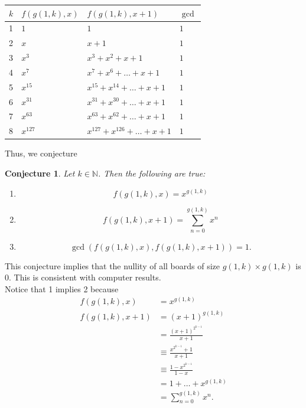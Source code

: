 \documentclass{article}
\newtheorem{conjecture}{Conjecture}
\newcommand{\N}{\mathbb{N}}
\begin{document}
	\begin{table}[H]
		\renewcommand{\arraystretch}{1.5}
		\centering
		\begin{tabular}{|l||l|l|l|}
			\hline
			$k$ & $f(g(1,k),x)$ & $f(g(1,k),x+1)$ & $\gcd$  \\
			\hline\hline
			1 & $1$ & $1$ & $1$ \\
			\hline
			2 & $x$ & $x+1$ & $1$ \\
			\hline
			3 & $x^3$ & $x^3+x^2+x+1$ & $1$ \\
			\hline
			4 & $x^7$ & $x^7 + x^6 + \dots + x + 1$ & $1$ \\
			\hline
			5 & $x^{15}$ & $x^{15} + x^{14} + \dots + x + 1$ & $1$ \\
			\hline
			6 & $x^{31}$ & $x^{31} + x^{30} + \dots + x + 1$ & $1$ \\
			\hline
			7 & $x^{63}$ & $x^{63} + x^{62} + \dots + x + 1$ & $1$ \\
			\hline
			8 & $x^{127}$ & $x^{127} + x^{126} + \dots + x + 1$ & $1$ \\
			\hline  
		\end{tabular}
	\end{table}
	Thus, we conjecture
	\begin{conjecture}
		Let $k \in \N$.
		Then the following are true:
		\begin{enumerate}
			\item
			\begin{equation*}
				f(g(1,k),x) = x^{g(1,k)}
			\end{equation*}
			\item
			\begin{equation*}
				f(g(1,k),x+1) = \sum_{n=0}^{g(1,k)}{x^n}
			\end{equation*}
			\item
			\begin{equation*}
				\gcd\left({f(g(1,k),x), f(g(1,k),x+1)}\right) = 1.
			\end{equation*}
		\end{enumerate}
	\end{conjecture}
	This conjecture implies that the nullity of all boards of size $g(1,k) \times g(1,k)$ is $0$.
	This is consistent with computer results. \\
	
	Notice that 1 implies 2 because
	\begin{align*}
		f(g(1,k),x) &= x^{g(1,k)} \\
		f(g(1,k),x+1) &= (x+1)^{g(1,k)} \\
			&= \frac{(x+1)^{2^{k-1}}}{x+1} \\
			&\equiv \frac{x^{2^{k-1}}+1}{x+1} \\
			&\equiv \frac{1-x^{2^{k-1}}}{1-x} \\
			&= 1 + \dots + x^{g(1,k)} \\
			&= \sum_{n=0}^{g(1,k)}{x^n}.
	\end{align*}
	
\end{document}
